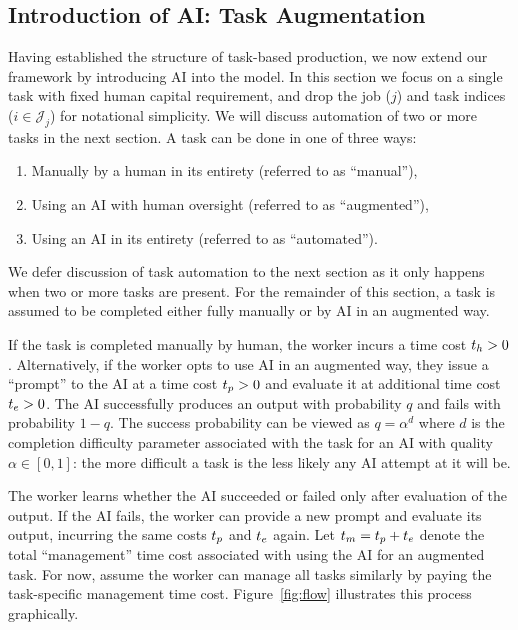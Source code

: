 \documentclass{article}
\theoremstyle{plain}
\theoremstyle{plain}
\begin{document}
\subsection{Introduction of AI: Task Augmentation}

Having established the structure of task-based production, we now extend our framework by introducing AI into the model.
In this section we focus on a single task with fixed human capital requirement, and drop the job ($j$) and task indices ($i \in \mathcal{J}_j$) for notational simplicity.
We will discuss automation of two or more tasks in the next section.
A task can be done in one of three ways:
\begin{enumerate}
\item Manually by a human in its entirety (referred to as ``manual''), 
\item Using an AI with human oversight (referred to as ``augmented''),
\item Using an AI in its entirety (referred to as ``automated'').
\end{enumerate}
We defer discussion of task automation to the next section as it only happens when two or more tasks are present.
For the remainder of this section, a task is assumed to be completed either fully manually or by AI in an augmented way.

If the task is completed manually by human, the worker incurs a time cost $t_{h} > 0$.
Alternatively, if the worker opts to use AI in an augmented way, they issue a ``prompt'' to the AI at a time cost $t_{p} > 0$ and evaluate it at additional time cost $t_{e} > 0$.
The AI successfully produces an output with probability $q$ and fails with probability $1-q$. 
The success probability can be viewed as $q=\alpha^d$ where $d$ is the completion difficulty parameter associated with the task for an AI with quality $\alpha \in [0,1]$: the more difficult a task is the less likely any AI attempt at it will be.

The worker learns whether the AI succeeded or failed only after evaluation of the output.
If the AI fails, the worker can provide a new prompt and evaluate its output, incurring the same costs $t_{p}$ and $t_{e}$ again.
Let $t_{m} = t_{p} + t_{e}$ denote the total ``management'' time cost associated with using the AI for an augmented task.
For now, assume the worker can manage all tasks similarly by paying the task-specific management time cost.
Figure~\ref{fig:flow} illustrates this process graphically.
\end{document}
